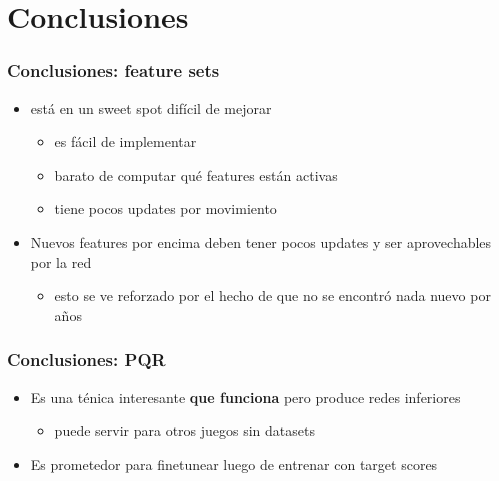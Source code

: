 
\section{Conclusiones}

\begin{frame}
\frametitle{Conclusiones: feature sets}
\begin{itemize}
\item {} está en un sweet spot difícil de mejorar
\begin{itemize}
    \item es fácil de implementar
    \item barato de computar qué features están activas
    \item tiene pocos updates por movimiento
\end{itemize}
\pause
\item Nuevos features por encima deben tener pocos updates y ser aprovechables por la red
\begin{itemize}
    \item esto se ve reforzado por el hecho de que no se encontró nada nuevo por años
\end{itemize}
\end{itemize}
\end{frame}

\begin{frame}
\frametitle{Conclusiones: PQR}
\begin{itemize}
\item Es una ténica interesante \textbf{que funciona} pero produce redes inferiores \pause
\begin{itemize}
    \item puede servir para otros juegos sin datasets \pause
\end{itemize}
\item Es prometedor para finetunear luego de entrenar con target scores \pause
\end{itemize}
\end{frame}
